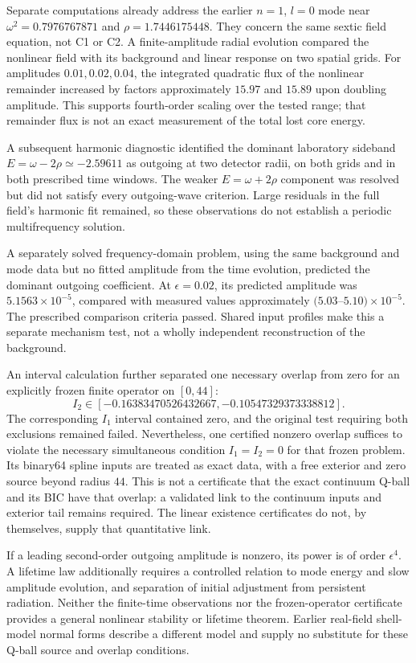 Separate computations already address the earlier $n=1$, $l=0$ mode
near $\omega^2=0.7976767871$ and $\rho=1.7446175448$. They concern the
same sextic field equation, not C1 or C2. A finite-amplitude radial
evolution compared the nonlinear field with its background and linear
response on two spatial grids. For amplitudes $0.01,0.02,0.04$, the
integrated quadratic flux of the nonlinear remainder increased by
factors approximately $15.97$ and $15.89$ upon doubling amplitude.
This supports fourth-order scaling over the tested range; that remainder
flux is not an exact measurement of the total lost core energy.

A subsequent harmonic diagnostic identified the dominant laboratory
sideband $E=\omega-2\rho\simeq-2.59611$ as outgoing at two detector
radii, on both grids and in both prescribed time windows. The weaker
$E=\omega+2\rho$ component was resolved but did not satisfy every
outgoing-wave criterion. Large residuals in the full field's harmonic
fit remained, so these observations do not establish a periodic
multifrequency solution.

A separately solved frequency-domain problem, using the same background
and mode data but no fitted amplitude from the time evolution, predicted
the dominant outgoing coefficient. At $\epsilon=0.02$, its predicted
amplitude was $5.1563\times10^{-5}$, compared with measured values
approximately $(5.03$--$5.10)\times10^{-5}$. The prescribed comparison
criteria passed. Shared input profiles make this a separate mechanism
test, not a wholly independent reconstruction of the background.

An interval calculation further separated one necessary overlap from
zero for an explicitly frozen finite operator on $[0,44]$:
\begin{equation}
 I_2\in[-0.16383470526432667,-0.10547329373338812].
 \label{nl:frozen}
\end{equation}
The corresponding $I_1$ interval contained zero, and the original test
requiring both exclusions remained failed. Nevertheless, one certified
nonzero overlap suffices to violate the necessary simultaneous condition
$I_1=I_2=0$ for that frozen problem. Its binary64 spline inputs are treated
as exact data, with a free exterior and zero source beyond radius $44$.
This is not a certificate that the exact continuum Q-ball and its BIC
have that overlap: a validated link to the continuum inputs and exterior
tail remains required. The linear existence certificates do not, by
themselves, supply that quantitative link.

If a leading second-order outgoing amplitude is nonzero, its power is
of order $\epsilon^4$. A lifetime law additionally requires a controlled
relation to mode energy and slow amplitude evolution, and separation of
initial adjustment from persistent radiation. Neither the finite-time
observations nor the frozen-operator certificate provides a general
nonlinear stability or lifetime theorem. Earlier real-field shell-model
normal forms describe a different model and supply no substitute for
these Q-ball source and overlap conditions.
